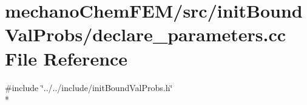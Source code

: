 \section{mechano\-Chem\-F\-E\-M/src/init\-Bound\-Val\-Probs/declare\-\_\-parameters.cc File Reference}
\label{init_bound_val_probs_2declare__parameters_8cc}
{\ttfamily \#include \char`\"{}../../include/init\-Bound\-Val\-Probs.\-h\char`\"{}}\\*
